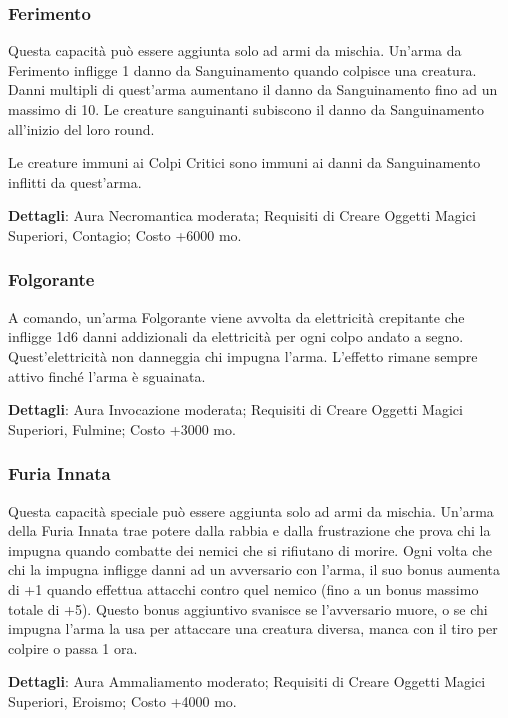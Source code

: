 \begin{multicols}{2}
\subsubsection*{Ferimento}

Questa capacità può essere aggiunta solo ad armi da mischia. Un'arma da Ferimento infligge 1 danno da Sanguinamento quando colpisce una creatura. Danni multipli di quest'arma aumentano il danno da Sanguinamento fino ad un massimo di 10.
Le creature sanguinanti subiscono il danno da Sanguinamento all'inizio del loro round.

Le creature immuni ai Colpi Critici sono immuni ai danni da Sanguinamento inflitti da quest'arma.

\textbf{Dettagli}: Aura Necromantica moderata; Requisiti di Creare Oggetti Magici Superiori, Contagio; Costo +6000 mo.

\subsubsection*{Folgorante}

A comando, un'arma Folgorante viene avvolta da elettricità crepitante che infligge 1d6 danni addizionali da elettricità per ogni colpo andato a segno. Quest'elettricità non danneggia chi impugna l'arma. L'effetto rimane sempre attivo finché l'arma è sguainata.

\textbf{Dettagli}: Aura Invocazione moderata; Requisiti di Creare Oggetti Magici Superiori, Fulmine; Costo +3000 mo.

\subsubsection*{Furia Innata}

Questa capacità speciale può essere aggiunta solo ad armi da mischia. Un'arma della Furia Innata trae potere dalla rabbia e dalla frustrazione che prova chi la impugna quando combatte dei nemici che si rifiutano di morire. Ogni volta che chi la impugna infligge danni ad un avversario con l'arma, il suo bonus aumenta di +1 quando effettua attacchi contro quel nemico (fino a un bonus massimo totale di +5). Questo bonus aggiuntivo svanisce se l'avversario muore, o se chi impugna l'arma la usa per attaccare una creatura diversa, manca con il tiro per colpire o passa 1 ora.

\textbf{Dettagli}: Aura Ammaliamento moderato; Requisiti di Creare Oggetti Magici Superiori, Eroismo; Costo +4000 mo.


\end{multicols}
